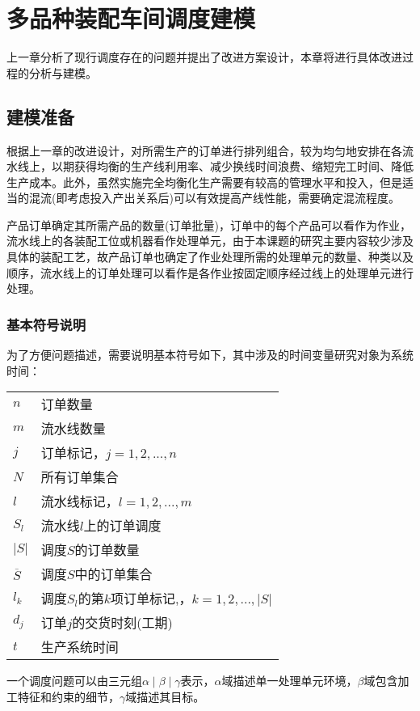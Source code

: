 \chapter{多品种装配车间调度建模}
上一章分析了现行调度存在的问题并提出了改进方案设计，本章将进行具体改进过程的分析与建模。

\section{建模准备}

根据上一章的改进设计，对所需生产的订单进行排列组合，较为均匀地安排在各流水线上，以期获得均衡的生产线利用率、减少换线时间浪费、缩短完工时间、降低生产成本。此外，虽然实施完全均衡化生产需要有较高的管理水平和投入，但是适当的混流(即考虑投入产出关系后)可以有效提高产线性能，需要确定混流程度。

产品订单确定其所需产品的数量(订单批量)，订单中的每个产品可以看作为作业，流水线上的各装配工位或机器看作处理单元，由于本课题的研究主要内容较少涉及具体的装配工艺，故产品订单也确定了作业处理所需的处理单元的数量、种类以及顺序，流水线上的订单处理可以看作是各作业按固定顺序经过线上的处理单元进行处理。

\subsection{基本符号说明}
为了方便问题描述，需要说明基本符号如下，其中涉及的时间变量研究对象为系统时间：\\[3pt]
\begin{supertabular}{ll}
$n$ & 订单数量\\
$m$ & 流水线数量\\
$j$ & 订单标记，$j = 1,2,...,n$\\
$N$ & 所有订单集合\\
$l$ & 流水线标记，$l = 1,2,...,m$\\
$S_l$ & 流水线$l$上的订单调度\\
$|S|$ & 调度$S$的订单数量\\
$\overline S$ & 调度$S$中的订单集合\\
$l_k$ & 调度$S_l$的第$k$项订单标记,，$k = 1,2,...,|S|$\\
$d_j$ & 订单$j$的交货时刻(工期)\\
$t$ & 生产系统时间\\[3pt]
\end{supertabular}

一个调度问题可以由三元组$\alpha \mid \beta \mid \gamma$表示，$\alpha$域描述单一处理单元环境，$\beta$域包含加工特征和约束的细节，$\gamma$域描述其目标\cite{pinedo}。

